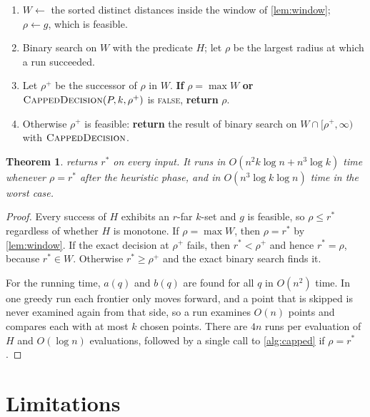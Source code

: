 \documentclass[11pt,a4paper]{article}
\newtheorem{theorem}{Theorem}
\theoremstyle{definition}
\theoremstyle{remark}
\newcommand{\rstar}{r^{*}}
\newcommand{\AlgCapped}{\textsc{CappedDecision}}
\newcommand{\AlgCert}{\textsc{Certified}}
\begin{document}
\begin{algorithm}[H]
\caption{$\AlgCert(P,k)$\quad ($k\ge3$)}\label{alg:certified}
\begin{enumerate}[label=\arabic*:,leftmargin=2em,itemsep=1pt,topsep=2pt]
\item $W\gets$ the sorted distinct distances inside the window of \cref{lem:window};\ \ $\rho\gets g$, which is feasible.
\item Binary search on $W$ with the predicate $H$; let $\rho$ be the largest radius at which a run succeeded.
\item Let $\rho^+$ be the successor of $\rho$ in $W$. \textbf{If} $\rho=\max W$ \textbf{or} $\AlgCapped(P,k,\rho^+)$ is \textsc{false}, \textbf{return} $\rho$.
\item Otherwise $\rho^+$ is feasible: \textbf{return} the result of binary search on $W\cap[\rho^+,\infty)$ with $\AlgCapped$.
\end{enumerate}
\end{algorithm}

\begin{theorem}\label{thm:cert}
 returns $\rstar$ on every input. It runs in
$O(n^2k\log n+n^3\log k)$ time whenever $\rho=\rstar$ after the heuristic
phase, and in $O(n^3\log k\log n)$ time in the worst case.
\end{theorem}
\begin{proof}
Every success of $H$ exhibits an $r$-far $k$-set and $g$ is feasible, so
$\rho\le\rstar$ regardless of whether $H$ is monotone. If $\rho=\max W$, then
$\rho=\rstar$ by \cref{lem:window}. If the exact decision at $\rho^+$ fails,
then $\rstar<\rho^+$ and hence $\rstar=\rho$, because $\rstar\in W$. Otherwise
$\rstar\ge\rho^+$ and the exact binary search finds it.

For the running time, $a(q)$ and $b(q)$ are found for all $q$ in $O(n^2)$
time. In one greedy run each frontier only moves forward, and a point that is
skipped is never examined again from that side, so a run examines $O(n)$
points and compares each with at most $k$ chosen points. There are $4n$ runs
per evaluation of $H$ and $O(\log n)$ evaluations, followed by a single call
to \cref{alg:capped} if $\rho=\rstar$.
\end{proof}

\section{Limitations}\label{sec:limitations}
\end{document}
